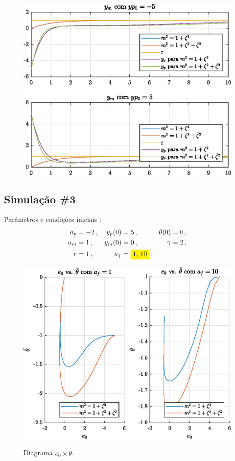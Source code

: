 \begin{figure}[H]
  \centering
  \includegraphics[width=12cm]{figs/yp/yp0-5yp05.eps} 
\end{figure}

\newpage%
\subsection{Simulação \#3}

\bigskip%
Parâmetros e condições iniciais  :
%
\begin{align*}
  a_p &= -2\,,  &  y_p(0) &= 5\,, & \theta(0) &= 0\,, \\
  a_m &= 1\,,   &  y_m(0) &= 0\,, & \gamma &= 2\,, \\
  r &= 1\,, & a_f &= \HI{1, 10}\,.
\end{align*}

\bigskip%
\begin{figure}[H]
  \centering
  \includegraphics[width=12cm]{figs/e0_vs_deltatheta/af1af10.eps} \\[2mm]
  \caption{Diagrama $e_0 \times \tilde{\theta}$.}
\end{figure}

